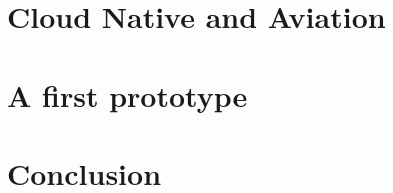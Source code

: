 \documentclass[titlepage]{report}
\begin{document}
\chapter{Cloud Native and Aviation}
\chapter{A first prototype}
\chapter{Conclusion}

\nocite{*}
\lstlistoflistings{}
\listoffigures
\printbibliography{}
\glsaddallunused
\printglossary{}
\end{document}
